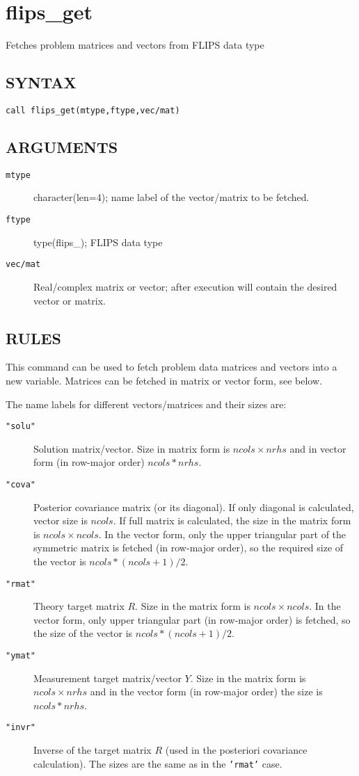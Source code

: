\documentclass[a4paper,twoside]{refrep}
\newcommand{\code}[1]{{\tt #1}}
\newcommand{\aitem}[1]{\item[{\tt #1}]}
\newenvironment{arglist}
	{\begin{description}}
	{\end{description}}
\begin{document}
\newpage
\section{flips\_get}\label{flipsget}
Fetches problem matrices and vectors from FLIPS data type

\subsection*{SYNTAX}
\code{call flips\_get(mtype,ftype,vec/mat)}

\subsection*{ARGUMENTS}
\begin{arglist}
\aitem{mtype} character(len=4); name label of the vector/matrix to be fetched.
\aitem{ftype} type(flips\_<s|d|c|z>); FLIPS data type
\aitem{vec/mat} Real/complex matrix or vector; after execution will contain the desired vector or matrix.
\end{arglist}

\subsection*{RULES}
This command can be used to fetch problem data matrices and vectors into a new variable. Matrices can be fetched in matrix or vector form, see below.


The name labels for different vectors/matrices and their sizes are:
\begin{arglist}
\aitem{"solu"} Solution matrix/vector. Size in matrix form is $ncols\times nrhs$ and in vector form (in row-major order) $ncols * nrhs$.
\aitem{"cova"} Posterior covariance matrix (or its diagonal). If only diagonal is calculated, vector size is $ncols$. If full matrix is calculated, the size in the matrix form is $ncols\times ncols$. In the vector form, only the upper triangular part of the symmetric matrix is fetched (in row-major order), so the required size of the vector is $ncols*(ncols+1)/2$.
\aitem{"rmat"} Theory target matrix $R$. Size in the matrix form is $ncols\times ncols$. In the vector form, only upper triangular part (in row-major order) is fetched, so the size of the vector is $ncols*(ncols+1)/2$.
\aitem{"ymat"} Measurement target matrix/vector $Y$. Size in the matrix form is $ncols\times nrhs$ and in the vector form (in row-major order) the size is $ncols*nrhs$.
\aitem{"invr"} Inverse of the target matrix $R$ (used in the posteriori covariance calculation). The sizes are the same as in the \code{'rmat'} case.
\end{arglist}
\end{document}
